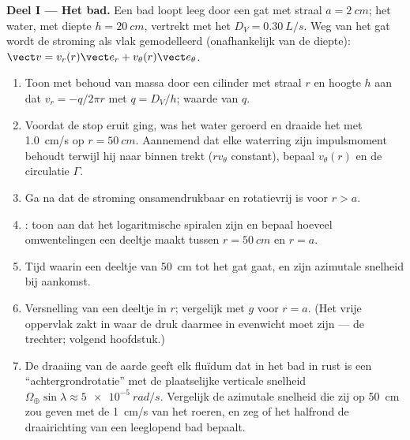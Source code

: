 \begin{problem}
\label{pb:b2:fluid-kinematics:1}

\medskip
\noindent\textbf{Deel I --- Het bad.}
Een bad loopt leeg door een gat met straal $a = \qty{2}{cm}$; het water, met
diepte $h = \qty{20}{cm}$, vertrekt met het 
$D_V =
\qty{0.30}{L/s}$. Weg van het gat wordt de stroming als vlak
gemodelleerd (onafhankelijk van de diepte):
$\vect v = v_r(r)\vect e_r + v_\theta(r)\vect e_\theta$.
\begin{enumerate}
  \item Toon met behoud van massa door een cilinder met straal $r$ en hoogte
        $h$ aan dat $v_r = -q/2\pi r$ met $q = D_V/h$; waarde van $q$.
  \item Voordat de stop eruit ging, was het water geroerd en draaide het met
        \qty{1.0}{cm/s} op $r = \qty{50}{cm}$. Aannemend dat elke waterring
        zijn impulsmoment behoudt terwijl hij naar binnen trekt ($rv_\theta$
        constant), bepaal $v_\theta(r)$ en de circulatie $\Gamma$.
  \item Ga na dat de stroming onsamendrukbaar en rotatievrij is voor $r > a$.
  \item {}: toon aan dat het logaritmische spiralen zijn en bepaal
        hoeveel omwentelingen een deeltje maakt tussen $r = \qty{50}{cm}$ en
        $r = a$.
  \item Tijd waarin een deeltje van \qty{50}{cm} tot het gat gaat, en zijn
        azimutale snelheid bij aankomst.
  \item Versnelling van een deeltje in $r$; vergelijk met $g$ voor $r = a$.
        (Het vrije oppervlak zakt in waar de druk daarmee in evenwicht moet
        zijn --- de trechter; volgend hoofdstuk.)
  \item De draaiing van de aarde geeft elk fluïdum dat in het bad in rust is
        een ``achtergrondrotatie'' met de plaatselijke verticale snelheid
        $\Omega_\oplus\sin\lambda \approx \qty{5e-5}{rad/s}$. Vergelijk de
        azimutale snelheid die zij op \qty{50}{cm} zou geven met de
        \qty{1}{cm/s} van het roeren, en zeg of het halfrond de
        draairichting van een leeglopend bad bepaalt.
\end{enumerate}


\end{problem}
